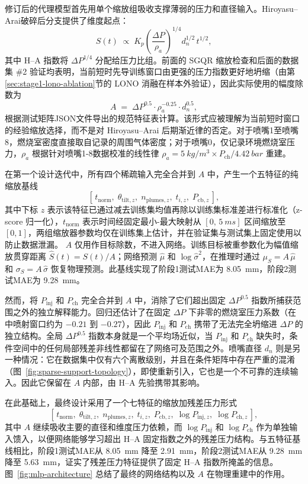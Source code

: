 修订后的代理模型首先用单个缩放组吸收支撑薄弱的压力和直径输入。Hiroyasu--Arai破碎后分支\cite{HiroyasuArai1990}提供了维度起点：
\[
S(t)\;\propto\;K_p\!\left(\frac{\Delta P}{\rho_a}\right)^{1/4}d_n^{1/2}\,t^{1/2},
\]
其中 H--A 指数将 \(\Delta P^{1/4}\) 分配给压力比组。前面的 SGQR 缩放检查和后面的数据集 \#2 验证均表明，当前短时先导训练窗口由更强的压力指数更好地坍缩（由第\ref{sec:stage1-lono-ablation}节的 LONO 消融在样本外验证），因此实际使用的幅度除数为
\[
A\;=\;\Delta P^{0.5}\cdot\rho_a^{-0.25}\cdot d_n^{0.5},
\]
根据测试矩阵JSON文件导出的规范特征表计算。该形式应被理解为当前短时窗口的经验缩放选择，而不是对 Hiroyasu--Arai 后期渐近律的否定。对于喷嘴1至喷嘴8，燃烧室密度直接取自记录的周围气体密度；对于喷嘴0，仅记录环境燃烧室压力，\(\rho_a\) 根据针对喷嘴1-8数据校准的线性律 \(\rho_a=\SI{5}{kg/m^3}\times P_{\mathrm{ch}}/\SI{4.42}{bar}\) 重建。

在第一个设计迭代中，所有四个稀疏输入完全合并到 $A$ 中，产生一个五特征的纯缩放基线
\[
[\,t_{\mathrm{norm}},\;\theta_{\mathrm{tilt},z},\;n_{\mathrm{plumes},z},\;t_{i,z},\;P_{\mathrm{cb},z}\,],
\]
其中下标 $z$ 表示该特征已通过减去训练集均值再除以训练集标准差进行标准化（z-score 归一化），$t_{\mathrm{norm}}$ 表示时间经固定最小-最大映射从 $[0,\,\SI{5}{ms}]$ 区间缩放至 $[0,1]$，两组缩放器参数均仅在训练集上估计，并在验证集与测试集上固定使用以防止数据泄漏。
$A$ 仅用作目标除数，不进入网络。训练目标被重参数化为幅值缩放贯穿距离 $\hat{S}(t)=S(t)/A$；网络预测 $\hat{\mu}$ 和 $\log\hat{\sigma}^2$，在推理时通过 $\mu_S=A\,\hat{\mu}$ 和 $\sigma_S=A\,\hat{\sigma}$ 恢复物理预测。此基线实现了阶段1测试MAE为 \SI{8.05}{mm}，阶段2测试MAE为 \SI{9.28}{mm}。

然而，将 $P_{\mathrm{inj}}$ 和 $P_{\mathrm{ch}}$ 完全合并到 $A$ 中，消除了它们超出固定 $\Delta P^{0.5}$ 指数所捕获范围之外的独立解释能力。回归还估计了在固定 $\Delta P$ 下非零的燃烧室压力系数（在中喷射窗口约为 \(-0.21\) 到 \(-0.27\)），因此 $P_{\mathrm{inj}}$ 和 $P_{\mathrm{ch}}$ 携带了无法完全坍缩进 $\Delta P$ 的独立结构。全局 $\Delta P^{0.5}$ 指数本身就是一个平均场近似，当 $P_{\mathrm{inj}}$ 和 $P_{\mathrm{ch}}$ 缺失时，条件空间中的任何局部残差非线性都留在了网络可及范围之外。喷嘴直径 $d_n$ 则是另一种情况：它在数据集中仅有六个离散级别，并且在条件矩阵中存在严重的混淆（图~\ref{fig:sparse-support-topology}），即使重新引入，它也是一个不可靠的连续输入。因此它保留在 $A$ 内部，由 H--A 先验携带其影响。

在此基础上，最终设计采用了一个七特征的缩放加残差压力形式
\[
[\,t_{\mathrm{norm}},\;\theta_{\mathrm{tilt},z},\;n_{\mathrm{plumes},z},\;t_{i,z},\;P_{\mathrm{cb},z},\;\log P_{\mathrm{inj},z},\;\log P_{\mathrm{ch},z}\,],
\]
其中 $A$ 继续吸收主要的直径和维度压力依赖，而 $\log P_{\mathrm{inj}}$ 和 $\log P_{\mathrm{ch}}$ 作为单独输入馈入，以便网络能够学习超出 H--A 固定指数之外的残差压力结构。与五特征基线相比，阶段1测试MAE从 \SI{8.05}{mm} 降至 \SI{2.91}{mm}，阶段2测试MAE从 \SI{9.28}{mm} 降至 \SI{5.63}{mm}，证实了残差压力特征提供了固定 H--A 指数所掩盖的信息。图~\ref{fig:mlp-architecture} 总结了最终的网络结构以及 $A$ 在物理重建中的作用。

